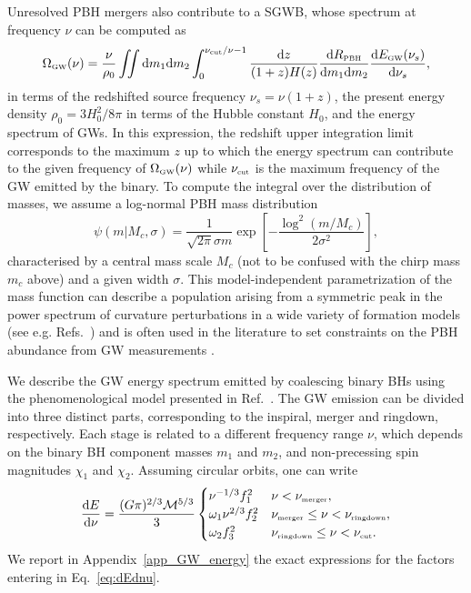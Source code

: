 \documentclass[11pt,a4paper]{article}
\renewcommand{\d}{{\rm d}}
\newcommand{\llp }{\left [}
\newcommand{\rrp }{\right ]}
\begin{document}
Unresolved PBH mergers also contribute to a SGWB, whose spectrum at frequency $\nu$ can be computed as
\begin{equation}\label{stocOmega}
\Omega_\text{\tiny GW} (\nu)= 
 \frac{\nu}{\rho_0} 
 \iint \d m_1 \d m_2 
  \int_0^{{\nu_\text{\tiny cut}}/{\nu}-1}
  \frac{ \d z }{(1+z)H(z)} 
  \frac{\d R_\text{\tiny PBH} }{\d m_1 \d m_2} 
   \frac{\d E_\text{\tiny GW} (\nu_s)}{\d \nu_s},
\end{equation}
in terms of the redshifted source frequency $\nu_s =\nu (1+z)$, the present energy density $\rho_0 = 3 H_0^2/8\pi$ in terms of the Hubble constant $H_0$, and the energy spectrum of GWs. 
In this expression, the redshift upper integration limit corresponds to the
maximum $z$ up to which the energy spectrum can contribute to the given frequency of $\Omega_\text{\tiny GW}(\nu)$ 
while $\nu_\text{\tiny cut}$ is the maximum frequency of the GW emitted by  the binary. 
To compute the integral over the distribution of masses, we assume a log-normal PBH mass distribution 
\begin{equation}\label{lognormal mass function}
    \psi(m | M_c, \sigma ) = 
    \frac{1}{\sqrt{2\pi}\sigma  m}
    \exp 
    \llp 
    -\frac{\log ^2 (m/M_c)}{2 \sigma^2} 
    \rrp,
\end{equation}
characterised by a central mass scale $M_c$ (not to be confused with the chirp mass $m_c$ above) and a given width $\sigma$.
This model-independent parametrization of the mass function can describe
a population arising from a symmetric peak in the power spectrum of curvature perturbations in a wide variety of formation models (see e.g. Refs.~\cite{Dolgov:1992pu,Carr:2017jsz}) and is often used in the literature to
set constraints on the PBH abundance from GW measurements 
\cite{Garcia-Bellido:2017fdg,Raidal:2018bbj,DeLuca:2020sae,Wong:2020yig,Gow:2019pok,Hall:2020daa,Hutsi:2020sol,DeLuca:2021wjr,Franciolini:2021tla}. 



We describe the GW energy spectrum emitted by coalescing binary BHs using the phenomenological model presented in Ref.~\cite{Ajith:2009bn}. 
The GW emission can be divided into three distinct parts, corresponding to the inspiral, merger and ringdown, respectively. 
Each stage is related to a different frequency range $\nu$, which depends on the binary BH component masses $m_1$ and $m_2$, and non-precessing spin magnitudes $\chi_1$ and $\chi_2$. 
Assuming circular orbits, one can write \cite{Zhu:2011bd}
\begin{equation}
    \frac{\mathrm{d}E}{\mathrm{d}\nu} = \frac{(G \pi)^{2/3} \mathcal{M}^{5/3}}{3} 
    \begin{cases}
     \nu^{-1/3} f_1^2  & \nu < \nu_\text{\tiny merger},
     \\
     \omega_1 \nu^{2/3} f_2^2 & \nu_\text{\tiny merger} \leq \nu < \nu_\text{\tiny ringdown},
      \\
     \omega_2 f_3^2 & \nu_\text{\tiny ringdown} \leq \nu < \nu_\text{\tiny cut}. 
    \end{cases}
    \label{eq:dEdnu}
\end{equation}
We report in Appendix~\ref{app_GW_energy} the exact expressions for the factors entering in Eq.~\eqref{eq:dEdnu}.
\end{document}
